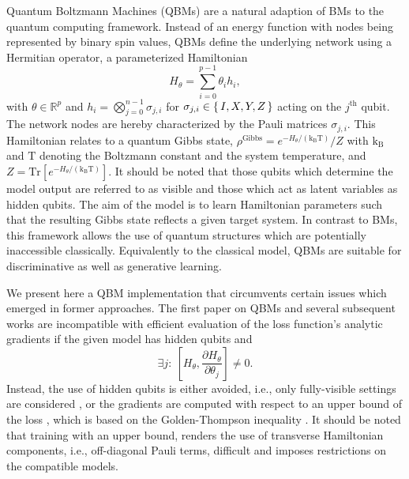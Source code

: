 \documentclass[twocolumn, aps, pra, superscriptaddress, floatfix]{revtex4}
\begin{document}
Quantum Boltzmann Machines (QBMs) \cite{QBMAmin18} are a natural adaption of BMs to the quantum computing framework. Instead of an energy function with nodes being represented by binary spin values, QBMs define the underlying network using a Hermitian operator, a parameterized Hamiltonian
\begin{equation*}
    H_{\theta}=\sum_{i=0}^{p-1}\theta_ih_i,
\end{equation*}
with $\theta\in\mathbb{R}^p$ and $h_i=\bigotimes_{j=0}^{n-1}\sigma_{j, i}$ for $\sigma_{j, i}\in\set{I, X, Y, Z}$ acting on the $j^{\text{th}}$ qubit. 
The network nodes are hereby characterized by the Pauli matrices $\sigma_{j, i}$.
This Hamiltonian relates to a quantum Gibbs state, $\rho^{\text{Gibbs}} = {e^{-H_{\theta}/\left(\text{k}_{\text{B}}\text{T}\right)}}/{Z}$
with $\text{k}_{\text{B}}$ and $\text{T}$ denoting the Boltzmann constant and the system temperature, and  $Z=\text{Tr}\left[e^{-H_{\theta}/\left(\text{k}_{\text{B}}\text{T}\right)}\right]$. 
It should be noted that those qubits which determine the model output are referred to as visible and those which act as latent variables as hidden qubits.
The aim of the model is to learn Hamiltonian parameters such that the resulting Gibbs state reflects a given target system.
In contrast to BMs, this framework allows the use of quantum structures which are potentially inaccessible classically.
Equivalently to the classical model, QBMs are suitable for discriminative as well as generative learning.

We present here a QBM implementation that circumvents certain issues which emerged in former approaches.
The first paper on QBMs \cite{QBMAmin18} and several subsequent works \cite{Anschtz2019RealizingQB, QBMWiebe17, Kappen18QBM, Wiebe2019GenerativeTO} are incompatible with efficient evaluation of the loss function's analytic gradients if the given model has hidden qubits and 
\begin{equation*}
    \exists j: \:\left[H_{\theta}, \frac{\partial H_{\theta}}{\partial\theta_j}\right] \neq 0.
\end{equation*}
Instead, the use of hidden qubits is either avoided, i.e., only fully-visible settings are considered \cite{QBMWiebe17, Kappen18QBM, Wiebe2019GenerativeTO}, or the gradients are computed with respect to an upper bound of the loss \cite{QBMAmin18, Anschtz2019RealizingQB, QBMWiebe17}, which is based on the Golden-Thompson inequality \cite{ThompsonInequality1965, Golden65Helm}.
It should be noted that training with an upper bound, renders the use of transverse Hamiltonian components, i.e., off-diagonal Pauli terms, difficult and imposes restrictions on the compatible models.
\end{document}

